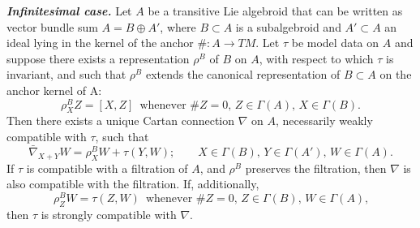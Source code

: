 \documentclass[leqno,12pt]{amsart} %
\begin{document}
\begin{proposition}
  {\em \bfseries\em Infinitesimal case.} Let $A$ be a transitive Lie algebroid that can be written as
  vector bundle sum $A = B \oplus A'$, where $B \subset A$ is a subalgebroid and
  $A' \subset A$ an ideal lying in the kernel of the anchor
  $\# \colon A \rightarrow TM$. Let $\tau $ be model data on $A$ and suppose
  there exists a representation $\rho^B$ of $B$ on $A$, with respect to which $\tau $ is
  invariant, and such that $\rho^B$ extends the canonical representation of $B \subset A $
  on the anchor kernel of A:
  \begin{equation}
    \rho^B_X Z = [X, Z]\enspace \text{whenever $\#Z=0$, $Z \in \Gamma(A)$,
      $X \in \Gamma(B)$}.\label{ext1}
  \end{equation}
  Then there exists a unique Cartan connection $\nabla $ on $A$, necessarily weakly
  compatible with $\tau $, such that
  \begin{equation}
    \bar\nabla_{X + Y}W = \rho^B_XW + \tau(Y, W);\qquad X
    \in \Gamma(B),\,Y \in \Gamma(A'),\,W \in \Gamma(A).\label{ext2}
  \end{equation}
  If $\tau $ is compatible with a filtration of $A$, and $\rho^B$ preserves the
  filtration, then $\nabla $ is also compatible with the filtration.
  If, additionally,
  \begin{equation}
    \rho^B_{Z}W = \tau(Z, W)\enspace
    \text{whenever $\#Z=0$, $Z \in \Gamma(B)$, $W \in \Gamma(A)$,}\label{ext3}
  \end{equation}
  then $\tau $ is strongly compatible with $\nabla $.


\end{proposition}
\end{document}
